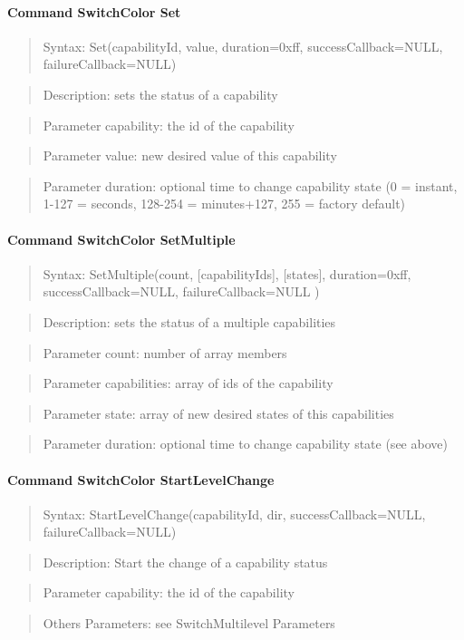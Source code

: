\paragraph {Command SwitchColor Set}
\begin{quote} Syntax: Set(capabilityId, value, duration=0xff, successCallback=NULL, failureCallback=NULL)\end{quote}
\begin{quote} Description: sets the status of a capability\end{quote}
\begin{quote} Parameter capability: the id of the capability\end{quote}
\begin{quote} Parameter value: new desired value of this capability\end{quote}
\begin{quote} Parameter duration: optional time to change capability state (0 = instant, 1-127 = seconds, 128-254 = minutes+127, 255 = factory default)\end{quote}

\paragraph {Command SwitchColor SetMultiple}
\begin{quote} Syntax: SetMultiple(count, [capabilityIds], [states], duration=0xff, successCallback=NULL, failureCallback=NULL )\end{quote}
\begin{quote} Description: sets the status of a multiple capabilities\end{quote}
\begin{quote} Parameter count: number of array members\end{quote}
\begin{quote} Parameter capabilities: array of ids of the capability\end{quote}
\begin{quote} Parameter state: array of new desired states of this capabilities\end{quote}
\begin{quote} Parameter duration: optional time to change capability state (see above)\end{quote}

\paragraph {Command SwitchColor StartLevelChange}
\begin{quote} Syntax: StartLevelChange(capabilityId, dir, successCallback=NULL, failureCallback=NULL)\end{quote}
\begin{quote} Description: Start the change of a capability status\end{quote}
\begin{quote} Parameter capability: the id of the capability\end{quote}
\begin{quote} Others Parameters: see SwitchMultilevel Parameters\end{quote} 

